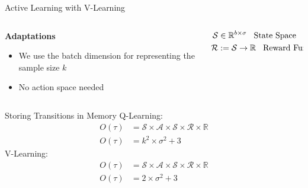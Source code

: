\documentclass[aspectratio=169, 11pt, invertlogo]{ismll-slides}
\begin{document}

\begin{frame}[fragile]{Active Learning with V-Learning}
	\begin{columns}
		\begin{column}{.4\linewidth}
			\textbf{Adaptations}
			\begin{itemize}
				\item We use the batch dimension for representing the sample size $k$
				\item No action space needed
				
			\end{itemize}
		\end{column}
		\begin{column}{.4\linewidth}
			\begin{align*}
			\mathcal{S} &\in \mathbb{R}^{b \times \sigma} \hspace{3mm}\text{State Space} \\
			\mathcal{R} &:= \mathcal{S} \rightarrow \mathbb{R} \hspace{3mm}\text{Reward Function} \\
			\end{align*}
		\end{column}
	\end{columns}
\end{frame}



\begin{frame}[fragile]{Storing Transitions in Memory}
	Q-Learning:
	\begin{align*}
		O(\tau) &= \mathcal{S} \times \mathcal{A} \times \mathcal{S} \times \mathcal{R} \times \mathbb{R} \\
		O(\tau) &= k^2 \times \sigma^2 + 3
	\end{align*}
	V-Learning:
	\begin{align*}
		O(\tau) &= \mathcal{S} \times \mathcal{A} \times \mathcal{S} \times \mathcal{R} \times \mathbb{R} \\
		O(\tau) &= 2 \times \sigma^2 + 3
	\end{align*}
\end{frame}



\end{document}
